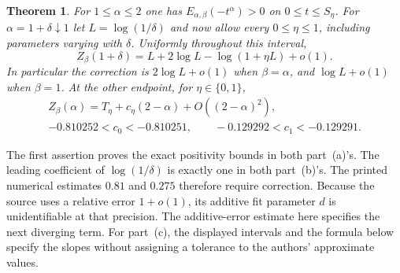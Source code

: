 \documentclass[11pt,a4paper]{article}
\newtheorem{theorem}{Theorem}[section]
\numberwithin{equation}{section}
\begin{document}
\begin{theorem}\label{cdh13:result}
For $1\le\alpha\le2$ one has
$E_{\alpha,\beta}(-t^\alpha)>0$ on $0\le t\le S_\eta$.
For $\alpha=1+\delta\downarrow1$ let $L=\log(1/\delta)$ and now
allow every $0\le\eta\le1$, including parameters varying with $\delta$.
Uniformly throughout this interval,
\begin{equation}\label{cdh13:crossover}
 Z_\beta(1+\delta)
 =L+2\log L-\log(1+\eta L)+o(1).
\end{equation}
In particular the correction is $2\log L+o(1)$ when $\beta=\alpha$,
and $\log L+o(1)$ when $\beta=1$.
At the other endpoint, for $\eta\in\{0,1\}$,
\[
 \begin{gathered}
 Z_\beta(\alpha)=T_\eta+c_\eta(2-\alpha)+O((2-\alpha)^2),\\
 -0.810252<c_0<-0.810251,\qquad -0.129292<c_1<-0.129291.
 \end{gathered}
\]
\end{theorem}
The first assertion proves the exact positivity bounds in both part~(a)'s.
The leading coefficient of $\log(1/\delta)$ is exactly one in both
part~(b)'s. The printed numerical estimates $0.81$ and $0.275$ therefore
require correction. Because the source uses a relative error $1+o(1)$,
its additive fit parameter $d$ is unidentifiable at that precision.
The additive-error estimate here specifies the next diverging term.
For part~(c), the displayed intervals and the formula below specify the
slopes without assigning a tolerance to the authors' approximate values.
\end{document}
